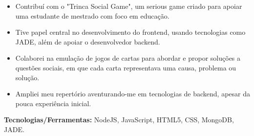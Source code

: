 \documentclass[10pt,a4paper]{altacv}
\begin{document}
\begin{itemize}
    \setlength{\itemindent}{0.5em}
    \item[--] Contribuí com o "Trinca Social Game", um serious game criado para apoiar uma estudante de mestrado com foco em educação.
    \item[--] Tive papel central no desenvolvimento do frontend, usando tecnologias como JADE, além de apoiar o desenvolvedor backend.
    \item[--] Colaborei na emulação de jogos de cartas para abordar e propor soluções a questões sociais, em que cada carta representava uma causa, problema ou solução.
    \item[--] Ampliei meu repertório aventurando-me em tecnologias de backend, apesar da pouca experiência inicial.
\end{itemize}
\textbf{Tecnologias/Ferramentas:} NodeJS, JavaScript, HTML5, CSS, MongoDB, JADE.
\end{document}
